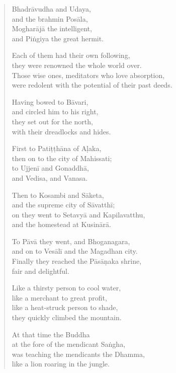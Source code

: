 \documentclass[12pt,openany]{book}%
\begin{document}
\begin{verse}
\textsanskrit{Bhadrāvudha} and Udaya, \\
and the brahmin \textsanskrit{Posāla}, \\
\textsanskrit{Mogharājā} the intelligent, \\
and \textsanskrit{Piṅgiya} the great hermit. 

Each of them had their own following, \\
they were renowned the whole world over. \\
Those wise ones, meditators who love absorption, \\
were redolent with the potential of their past deeds. 

Having bowed to \textsanskrit{Bāvari}, \\
and circled him to his right, \\
they set out for the north, \\
with their dreadlocks and hides. 

First to \textsanskrit{Patiṭṭhāna} of \textsanskrit{Aḷaka}, \\
then on to the city of Mahissati; \\
to \textsanskrit{Ujjenī} and \textsanskrit{Gonaddhā}, \\
and Vedisa, and Vanasa. 

Then to Kosambi and \textsanskrit{Sāketa}, \\
and the supreme city of \textsanskrit{Sāvatthī}; \\
on they went to \textsanskrit{Setavyā} and Kapilavatthu, \\
and the homestead at \textsanskrit{Kusinārā}. 

To \textsanskrit{Pāvā} they went, and Bhoganagara, \\
and on to \textsanskrit{Vesālī} and the Magadhan city. \\
Finally they reached the \textsanskrit{Pāsāṇaka} shrine, \\
fair and delightful. 

Like a thirsty person to cool water, \\
like a merchant to great profit, \\
like a heat-struck person to shade, \\
they quickly climbed the mountain. 

At that time the Buddha \\
at the fore of the mendicant \textsanskrit{Saṅgha}, \\
was teaching the mendicants the Dhamma, \\
like a lion roaring in the jungle. 


\end{verse}
\end{document}
